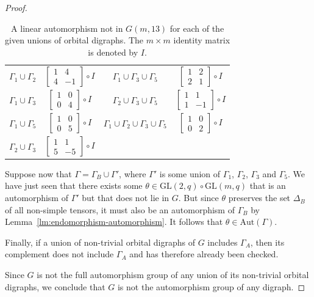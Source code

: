 \documentclass[10pt]{amsart}
\theoremstyle{definition}
\theoremstyle{plain}
\theoremstyle{plain}
\theoremstyle{plain}
\theoremstyle{plain}
\newcommand{\Aut}{\mathrm{Aut}}
\newcommand{\GL}{\mathrm{GL}}
\begin{document}
\begin{proof}
\begin{table}
\begin{tabular}{cc||cc}
\vphantom{\Bigg(} $\Gamma_1 \cup \Gamma_2$ & $\begin{bmatrix} 1 & 4 \\ 4 & -1 \end{bmatrix} \circ I$ & $\Gamma_1 \cup \Gamma_3 \cup \Gamma_5$ & $\begin{bmatrix} 1 & 2 \\ 2 & 1 \end{bmatrix} \circ I$ \\
\vphantom{\Bigg(} $\Gamma_1 \cup \Gamma_3$ & $\begin{bmatrix} 1 & 0 \\ 0 & 4 \end{bmatrix} \circ I$ & $\Gamma_2 \cup \Gamma_3 \cup \Gamma_5$ & $\begin{bmatrix} 1 & 1 \\ 1 & -1 \end{bmatrix} \circ I$ \\
\vphantom{\Bigg(} $\Gamma_1 \cup \Gamma_5$ & $\begin{bmatrix} 1 & 0 \\ 0 & 5 \end{bmatrix} \circ I$ & $\Gamma_1 \cup \Gamma_2 \cup \Gamma_3 \cup \Gamma_5$ & $\begin{bmatrix} 1 & 0 \\ 0 & 2 \end{bmatrix} \circ I$ \\
\vphantom{\Bigg(} $\Gamma_2 \cup \Gamma_3$ & $\begin{bmatrix} 1 & 1 \\ 5 & -5 \end{bmatrix} \circ I$ \\
\hline
\end{tabular}
\caption{A linear automorphism not in $G{\left(m, 13 \right)}$ for each of the given unions of orbital digraphs. The $m \times m$ identity matrix is denoted by $I$.}
\label{tbl:q=13,endomorphisms}
\end{table}

Suppose now that $\Gamma = \Gamma_B \cup \Gamma'$, where $\Gamma'$ is some union of $\Gamma_1$, $\Gamma_2$, $\Gamma_3$ and $\Gamma_5$. We have just seen that there exists some $\theta \in \GL{\left(2, q \right)} \circ \GL{\left(m, q \right)}$ that is an automorphism of $\Gamma'$ but that does not lie in $G$. But since $\theta$ preserves the set $\Delta_B$ of all non-simple tensors, it must also be an automorphism of $\Gamma_B$ by Lemma~\ref{lm:endomorphism-automorphism}. It follows that $\theta \in \Aut{\left(\Gamma \right)}$.

Finally, if a union of non-trivial orbital digraphs of $G$ includes $\Gamma_A$, then its complement does not include $\Gamma_A$ and has therefore already been checked.

Since $G$ is not the full automorphism group of any union of its non-trivial orbital digraphs, we conclude that $G$ is not the automorphism group of any digraph.
\end{proof}
\end{document}
